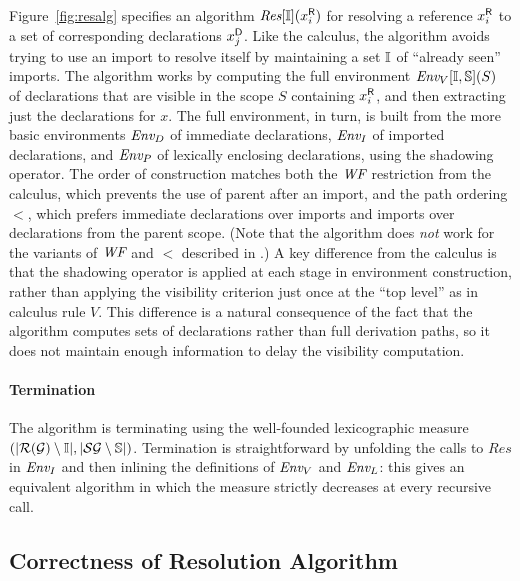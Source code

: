 
\noindent
Figure~\ref{fig:resalg} specifies an algorithm $\mbox{\it{Res}}[\mathbb{I}]({x}^{\mbox{\scriptsize\sf R}}_{i})$
for resolving a reference ${x}^{\mbox{\scriptsize\sf R}}_{i}$
to a set of corresponding declarations ${x}^{\mbox{\scriptsize\sf D}}_{j}$.
Like the calculus,
the algorithm avoids trying to use an import to resolve itself
by maintaining a set $\mathbb{I}$ of ``already seen'' imports.
The algorithm works by computing the full environment $\mbox{\it{Env}}_{V}[\mathbb{I},\mathbb{S}](S)$ 
of declarations that are visible in the scope $S$ containing ${x}^{\mbox{\scriptsize\sf R}}_{i}$, and 
then extracting just the declarations for $x$. The full environment, in turn,
is built from the more basic environments $\mbox{\it{Env}}_{D}$ of immediate declarations,
$\mbox{\it{Env}}_{I}$ of imported declarations, and $\mbox{\it{Env}}_{P}$ of lexically enclosing declarations,
using the shadowing operator.  The order of construction matches both the $\mbox{\it{WF}}$ restriction
from the calculus, which prevents the use of parent after an import, and  the path ordering $<$,
which prefers immediate declarations over imports and imports over 
declarations from the parent scope.  
(Note that the algorithm does \emph{not} work for the variants of $\mbox{\it{WF}}$
and $<$ described in .)
A key difference from the calculus is that the shadowing operator is applied at
each stage in environment construction, rather than applying the visibility 
criterion just once at the ``top level'' as in calculus rule $V$. 
This difference is a natural consequence of the fact that the algorithm computes
sets of declarations rather than full derivation paths, so it does not maintain
enough information to delay the visibility computation.

\paragraph{Termination} The algorithm is terminating using the well-founded
lexicographic measure  $(|\mathcal{R}(\mathcal{G}) \setminus \mathbb{I}|,|\mathcal{S}{\mathcal{G}} \setminus \mathbb{S}|)$.
Termination is straightforward by unfolding the calls to $Res$ in $\mbox{\it{Env}}_{I}$ and then 
inlining the definitions of $\mbox{\it{Env}}_{V}$ and $\mbox{\it{Env}}_{L}$: this gives an equivalent algorithm 
in which the measure strictly decreases at every recursive call.

\subsection{Correctness of Resolution Algorithm}

